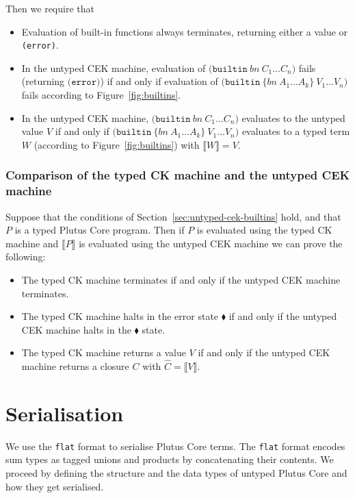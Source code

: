 \documentclass[a4paper]{article}
\newcommand{\keyword}[1]{\texttt{#1}}
\newcommand{\construct}[1]{\texttt{(} #1 \texttt{)}}
\newcommand\discharge[1]{\widehat{#1}}
\newcommand{\builtin}[3]{\construct{\keyword{builtin} ~ \texttt{\{} \mathit{#1} ~ #2 \texttt{\}} ~ #3}}
\newcommand{\errorU}{\construct{\keyword{error}}}
\newcommand{\builtinU}[2]{\construct{\keyword{builtin} ~ \mathit{#1} ~ #2}}
\newcommand{\erase}[1]{\llbracket#1\rrbracket}
\begin{document}
\begin{appendices}
\noindent Then we require that
\begin{itemize}
\item Evaluation of built-in functions always terminates, returning either a value or \texttt{(error)}.

\item In the untyped CEK machine, evaluation of 
  $\builtinU{bn}{C_1 \ldots C_n}$
fails (returning $\errorU$) if and only if evaluation of 
  $\builtin{bn}{A_1 \ldots A_k}{V_1 \ldots V_n}$
fails according to Figure~\ref{fig:builtins}.

\item In the untyped CEK machine,
  $\builtinU{bn}{C_1 \ldots C_n}$
evaluates to the untyped value $V$ if and only if
  $\builtin{bn}{A_1 \ldots A_k}{V_1 \ldots V_n}$
evaluates to a typed term $W$ (according to Figure~\ref{fig:builtins}) with $\erase{W} = V$.
\end{itemize}

\subsubsection{Comparison of the typed CK machine and the untyped CEK machine}
Suppose that the conditions of Section~\ref{sec:untyped-cek-builtins}
hold, and that $P$ is a typed Plutus Core program.  Then if $P$ is
evaluated using the typed CK machine and $\erase{P}$ is evaluated
using the untyped CEK machine we can prove the following:
\begin{itemize}
\item The typed CK machine terminates if and only if the untyped CEK machine terminates.
\item The typed CK machine halts in the error state $\blacklozenge$ if and only if
the untyped CEK machine halts in the $\blacklozenge$ state.
\item The typed CK machine returns a value $V$ if and only if the untyped CEK machine returns a
closure $C$ with $\discharge{C} = \erase{V}$.
\end{itemize}

\section{Serialisation}

We use the \texttt{flat} \citep{flat} format to serialise Plutus Core terms. The
\texttt{flat} format encodes sum types as tagged unions and products by
concatenating their contents. We proceed by defining the structure and the data
types of untyped Plutus Core and how they get serialised.


\end{appendices}
\end{document}

